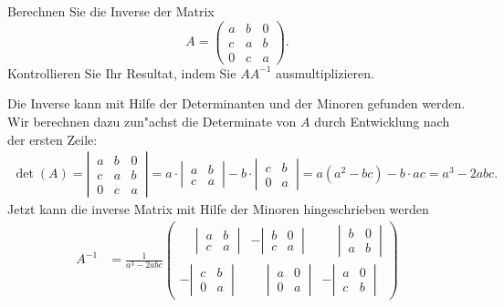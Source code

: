 Berechnen Sie die Inverse der Matrix
\[
A=
\begin{pmatrix}
a&b&0\\
c&a&b\\
0&c&a
\end{pmatrix}.
\]
Kontrollieren Sie Ihr Resultat, indem Sie $AA^{-1}$ ausmultiplizieren.

\begin{loesung}
Die Inverse kann mit Hilfe der Determinanten und der Minoren gefunden werden.
Wir berechnen dazu zun"achst die Determinate von $A$ durch Entwicklung
nach der ersten Zeile:
\begin{align*}
\det(A)=\left|\,\begin{matrix}
a&b&0\\
c&a&b\\
0&c&a
\end{matrix}\,\right|
=
a
\cdot
\left|\,\begin{matrix}a&b\\c&a\end{matrix}\,\right|
-b
\cdot
\left|\,\begin{matrix}c&b\\0&a\end{matrix}\,\right|
=
a(a^2-bc)-b\cdot ac=a^3-2abc.
\end{align*}
Jetzt kann die inverse Matrix mit Hilfe der Minoren hingeschrieben werden
\begin{align}
A^{-1}
&=
\frac1{a^3-2abc}\begin{pmatrix}
\phantom{-}\left|\,\begin{matrix}a&b\\c&a\end{matrix}\,\right|
	&-\left|\,\begin{matrix}b&0\\c&a\end{matrix}\,\right|
		&\phantom{-}\left|\,\begin{matrix}b&0\\a&b\end{matrix}\,\right|
			\\[13pt]
-\left|\,\begin{matrix}c&b\\0&a\end{matrix}\,\right|
	&\phantom{-}\left|\,\begin{matrix}a&0\\0&a\end{matrix}\,\right|
		&-\left|\,\begin{matrix}a&0\\c&b\end{matrix}\,\right|

\end{pmatrix}
\end{align}
\end{loesung}
